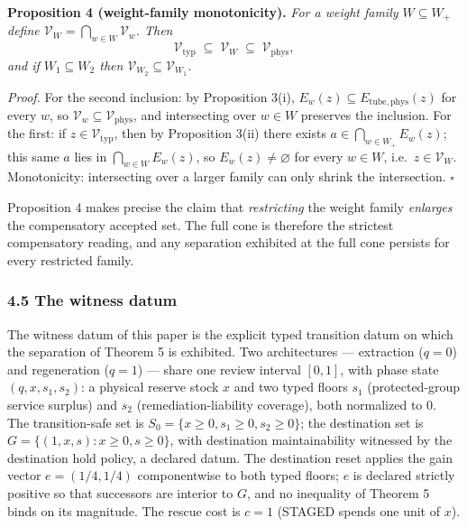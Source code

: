 \documentclass[11pt]{article}
\begin{document}
\textbf{Proposition 4 (weight-family monotonicity).} \emph{For a weight
family \(W \subseteq W_+\) define
\(\mathcal{V}_W = \bigcap_{w \in W} \mathcal{V}_w\). Then}
\[\mathcal{V}_{\mathrm{typ}} \;\subseteq\; \mathcal{V}_W \;\subseteq\; \mathcal{V}_{\mathrm{phys}},\]
\emph{and if \(W_1 \subseteq W_2\) then
\(\mathcal{V}_{W_2} \subseteq \mathcal{V}_{W_1}\).}

\emph{Proof.} For the second inclusion: by Proposition 3(i),
\(E_w(z) \subseteq E_{\mathrm{tube,phys}}(z)\) for every \(w\), so
\(\mathcal{V}_w \subseteq \mathcal{V}_{\mathrm{phys}}\), and
intersecting over \(w \in W\) preserves the inclusion. For the first: if
\(z \in \mathcal{V}_{\mathrm{typ}}\), then by Proposition 3(ii) there
exists \(a \in \bigcap_{w \in W_+} E_w(z)\); this same \(a\) lies in
\(\bigcap_{w \in W} E_w(z)\), so \(E_w(z) \neq \varnothing\) for every
\(w \in W\), i.e.~\(z \in \mathcal{V}_W\). Monotonicity: intersecting
over a larger family can only shrink the intersection. \ensuremath{\square}

Proposition 4 makes precise the claim that \emph{restricting} the weight
family \emph{enlarges} the compensatory accepted set. The full cone is
therefore the strictest compensatory reading, and any separation
exhibited at the full cone persists for every restricted family.

\subsubsection{4.5 The witness datum}\label{the-witness-datum}

The witness datum of this paper is the explicit typed transition datum
on which the separation of Theorem 5 is exhibited. Two architectures ---
extraction (\(q = 0\)) and regeneration (\(q = 1\)) --- share one review
interval \([0,1]\), with phase state \((q, x, s_1, s_2)\): a physical
reserve stock \(x\) and two typed floors \(s_1\) (protected-group
service surplus) and \(s_2\) (remediation-liability coverage), both
normalized to \(0\). The transition-safe set is
\(S_0 = \{ x \ge 0, s_1 \ge 0, s_2 \ge 0 \}\); the destination set is
\(G = \{ (1, x, s) : x \ge 0, s \ge 0 \}\), with destination
maintainability witnessed by the destination hold policy, a declared
datum. The destination reset applies the gain vector \(e = (1/4, 1/4)\)
componentwise to both typed floors; \(e\) is declared strictly positive
so that successors are interior to \(G\), and no inequality of Theorem 5
binds on its magnitude. The rescue cost is \(c = 1\) (STAGED spends one
unit of \(x\)).
\end{document}
